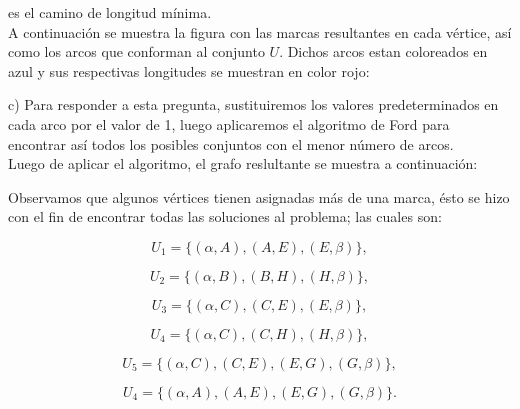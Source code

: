\documentclass[autocontact]{gaceta}
\begin{document}
    es el camino de longitud mínima.\\ A continuación se muestra la figura con las marcas resultantes 
    en cada vértice, así como los arcos que conforman 
    al conjunto $U$. Dichos arcos estan coloreados en azul y sus respectivas longitudes se muestran en 
    color rojo:

    

    c) Para responder a esta pregunta, sustituiremos los valores predeterminados en cada 
    arco por el valor de 1, luego aplicaremos el algoritmo de Ford para encontrar así 
    todos los posibles conjuntos con el menor número de arcos.
    \\Luego de aplicar el algoritmo, el grafo reslultante se muestra a continuación:

    \pagebreak

    
    Observamos que algunos vértices tienen asignadas más de una marca, ésto se hizo con el fin de 
    encontrar todas las soluciones al problema; las cuales son:
    \begin{center}
       \begin{equation}
            U_1 = \{(\alpha,A), (A,E), (E,\beta)\},              
       \end{equation}
       
       \begin{equation}
            U_2 = \{(\alpha,B), (B,H), (H,\beta)\},
       \end{equation}

       \begin{equation}
            U_3 = \{(\alpha,C), (C,E), (E,\beta)\},
       \end{equation}

       \begin{equation}
            U_4 = \{(\alpha,C), (C,H), (H,\beta)\},
       \end{equation}

       \begin{equation}
            U_5 = \{(\alpha,C), (C,E), (E,G), (G,\beta)\},
       \end{equation}

       \begin{equation}
            U_4 = \{(\alpha,A), (A,E), (E,G), (G,\beta)\}.
       \end{equation}
    \end{center}
    
\end{document}
